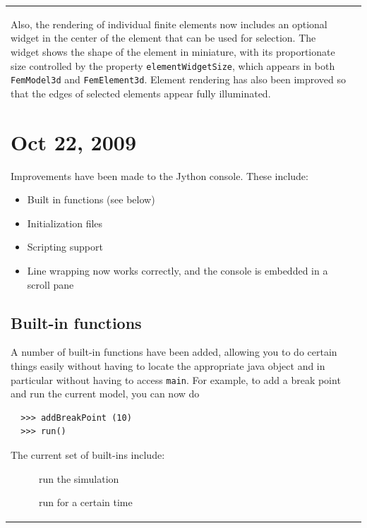 \documentclass{article}
\begin{document}
\begin{tabular}{ll}
Also, the rendering of individual finite elements now includes an
optional widget in the center of the element that can be used for
selection. The widget shows the shape of the element in miniature,
with its proportionate size controlled by the property
{\tt elementWidgetSize}, which appears in both {\tt FemModel3d} and
{\tt FemElement3d}. Element rendering has also been improved so that the
edges of selected elements appear fully illuminated.

\section*{Oct 22, 2009}

Improvements have been made to the Jython console. These include:

\begin{itemize}

\item Built in functions (see below)
\item Initialization files
\item Scripting support
\item Line wrapping now works correctly, and the console is embedded in a scroll
pane

\end{itemize}

\subsection*{Built-in functions}

A number of built-in functions have been added, allowing you to do
certain things easily without having to locate the appropriate java
object and in particular without having to access {\tt main}. For
example, to add a break point and run the current model, you can now
do

\begin{verbatim}
  >>> addBreakPoint (10)
  >>> run()
\end{verbatim}

The current set of built-ins include:

\begin{description}

\item[{\tt run()}] \mbox{}

 run the simulation

\item[{\tt run(tinc)}] \mbox{}

 run for a certain time


\end{description}
\end{tabular}
\end{document}
